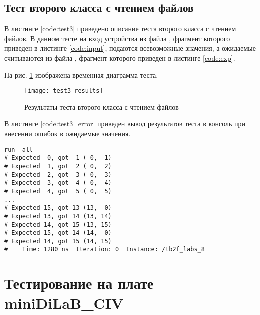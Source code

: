 \subsection{Тест второго класса с чтением файлов}

В листинге \ref{code:test3} приведено описание теста второго класса с чтением файлов. В данном тесте на вход устройства из файла , фрагмент которого приведен в листинге \ref{code:input}, подаются всевозможные значения, а ожидаемые считываются из файла , фрагмент которого приведен в листинге \ref{code:exp}.

\begin{multicols}{2}
		
	
\end{multicols}

На рис. \ref{fig:test3_results} изображена временная диаграмма теста.
\vspace{-0.5cm}
\begin{figure}[H]
	\begin{center}
		\texttt{[image: test3\_results]}
		\caption{Результаты теста второго класса с чтением файлов}
		\label{fig:test3_results}
	\end{center}
\end{figure}

В листинге \ref{code:test3_error} приведен вывод результатов теста в консоль при внесении ошибок в ожидаемые значения.
\begin{lstlisting}[caption=Результаты ошибочного теста второго класса с чтением файлов, label=code:test3_error, style=console]
run -all
# Expected  0, got  1 ( 0,  1)
# Expected  1, got  2 ( 0,  2)
# Expected  2, got  3 ( 0,  3)
# Expected  3, got  4 ( 0,  4)
# Expected  4, got  5 ( 0,  5)
...
# Expected 15, got 13 (13,  0)
# Expected 13, got 14 (13, 14)
# Expected 14, got 15 (13, 15)
# Expected 15, got 14 (14,  0)
# Expected 14, got 15 (14, 15)
#    Time: 1280 ns  Iteration: 0  Instance: /tb2f_labs_8
\end{lstlisting}

\section{Тестирование на плате miniDiLaB\_CIV}


